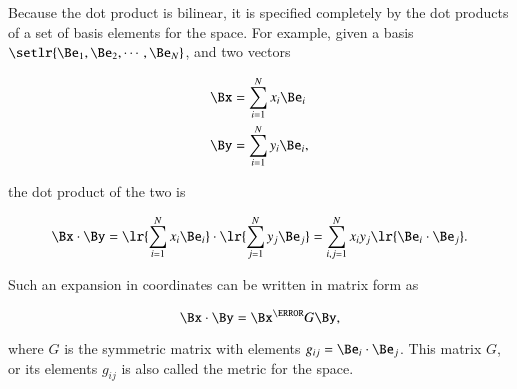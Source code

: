 %
%

Because the dot product is bilinear, it is
specified completely by the dot products of a set of basis elements for the space.
For example,
given a basis \( \setlr{ \Be_1, \Be_2, \cdots, \Be_N} \), and two vectors

\begin{dmath}\label{eqn:prerequisites:240}
\begin{aligned}
   \Bx &= \sum_{i = 1}^N x_i \Be_i \\
   \By &= \sum_{i = 1}^N y_i \Be_i,
\end{aligned}
\end{dmath}

the dot product of the two is

\begin{dmath}\label{eqn:prerequisites:260}
\Bx \cdot \By
=
   \lr{ \sum_{i = 1}^N x_i \Be_i } \cdot
   \lr{ \sum_{j = 1}^N y_j \Be_j }
=
   \sum_{i,j = 1}^N x_i y_j \lr{ \Be_i \cdot \Be_j }.
\end{dmath}

Such an expansion in coordinates can be written in matrix form as

\begin{dmath}\label{eqn:prerequisites:280}
\Bx \cdot \By
=
\Bx^\T G \By,
\end{dmath}

where \( G \) is the symmetric matrix with elements \( g_{ij} = \Be_i \cdot \Be_j \).
This matrix \( G \), or its elements \( g_{ij} \) is also called the metric for the space.

